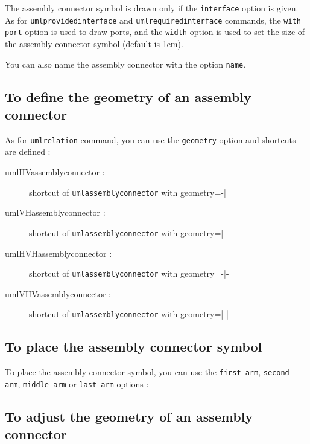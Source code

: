 \documentclass[a4paper,11pt]{report}
\newcommand{\inputTikZ}[1]{%
  }%
\newcommand{\inputTikZ}[1]{%
    \texttt{[image: fig/\#1.pdf]}%
  }%
\begin{document}
\medskip

The assembly connector symbol is drawn only if the {\tt interface} option is given. As for {\tt umlprovidedinterface} and {\tt umlrequiredinterface} commands, the {\tt  with port} option is used to draw ports, and the {\tt width} option is used to set the size of the assembly connector symbol (default is 1em).

You can also name the assembly connector with the option {\tt name}.

\subsection{To define the geometry of an assembly connector}

As for {\tt umlrelation} command, you can use the {\tt geometry} option and shortcuts are defined :

\begin{description}
\item[umlHVassemblyconnector :] shortcut of {\tt umlassemblyconnector} with geometry=-|
\item[umlVHassemblyconnector :] shortcut of {\tt umlassemblyconnector} with geometry=|-
\item[umlHVHassemblyconnector :] shortcut of {\tt umlassemblyconnector} with geometry=-|-
\item[umlVHVassemblyconnector :] shortcut of {\tt umlassemblyconnector} with geometry=|-|
\end{description}

\subsection{To place the assembly connector symbol}

To place the assembly connector symbol, you can use the {\tt first arm}, {\tt second arm}, {\tt middle arm} or {\tt last arm} options :

\medskip

\begin{minipage}{0.45\textwidth}

\end{minipage}
\begin{minipage}{0.55\textwidth}
\begin{center}
\inputTikZ{componentassemblyconnectorarm}
\end{center}
\end{minipage}

\subsection{To adjust the geometry of an assembly connector}
\end{document}
